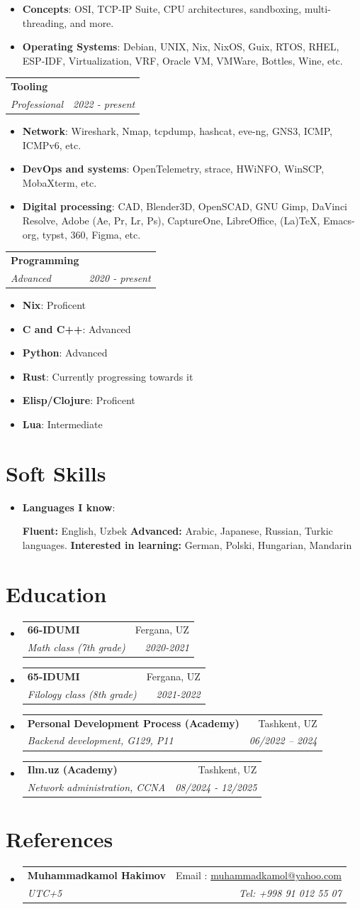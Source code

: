 \documentclass[a4paper,11pt]{article}
\makeatletter
\newcommand{\resumeItem}[2]{
    \item\small{
        \textbf{#1}{: #2 \vspace{-2pt}}
    }
}
\newcommand{\resumeSubheading}[4]{
    \vspace{-1pt}\item
    \begin{tabular*}{0.97\textwidth}{l@{\extracolsep{\fill}}r}
        \textbf{#1}       & #2                 \\
        \textit{\small#3} & \textit{\small #4} \\
    \end{tabular*}\vspace{-5pt}
}
\newcommand{\resumeSubHeadingListStart}{\begin{itemize}[leftmargin=*]}
\newcommand{\resumeSubHeadingListEnd}{\end{itemize}}
\newcommand{\resumeItemListStart}{\begin{itemize}}
\newcommand{\resumeItemListEnd}{\end{itemize}\vspace{-5pt}}
\makeatother
\begin{document}
\resumeItemListStart
\resumeItem{Concepts}{OSI, TCP-IP Suite, CPU architectures, sandboxing, multi-threading, and more. }
\resumeItem{Operating Systems}{Debian, UNIX, Nix, NixOS, Guix, RTOS, RHEL, ESP-IDF, Virtualization, VRF, Oracle VM, VMWare, Bottles, Wine, etc.}
\resumeItemListEnd

\resumeSubheading
{Tooling}{}
{Professional}{2022 - present}

\resumeItemListStart
\resumeItem{Network}{Wireshark, Nmap, tcpdump, hashcat, eve-ng, GNS3, ICMP, ICMPv6, etc. }
\resumeItem{DevOps and systems}{OpenTelemetry, strace, HWiNFO, WinSCP, MobaXterm, etc. }
\resumeItem{Digital processing}{CAD, Blender3D, OpenSCAD, GNU Gimp, DaVinci Resolve, Adobe (Ae, Pr, Lr, Ps), CaptureOne, LibreOffice, (La)TeX, Emacs-org, typst, 360, Figma, etc. }
\resumeItemListEnd


\resumeSubheading
{Programming}{}
{Advanced}{2020 - present}

\resumeItemListStart
\resumeItem{Nix}{Proficent}
\resumeItem{C and C++}{Advanced}
\resumeItem{Python}{Advanced}
\resumeItem{Rust}{Currently progressing towards it}
\resumeItem{Elisp/Clojure}{Proficent}
\resumeItem{Lua}{Intermediate}
\resumeItemListEnd

\section{Soft Skills}
\resumeSubHeadingListStart
\resumeItem{Languages I know}{}
\subitem \textbf{Fluent:} English, Uzbek
\subitem \textbf{Advanced:} Arabic, Japanese, Russian, Turkic languages.
\subitem \textbf{Interested in learning:} German, Polski, Hungarian, Mandarin
\resumeSubHeadingListEnd

\section{Education}
\resumeSubHeadingListStart
\resumeSubheading
{66-IDUMI}{Fergana, UZ}
{Math class (7th grade)}{2020-2021}
\resumeSubheading
{65-IDUMI}{Fergana, UZ}
{Filology class (8th grade)}{2021-2022}
\resumeSubheading
{Personal Development Process (Academy)}{Tashkent, UZ}
{Backend development, G129, P11}{06/2022 – 2024}
\resumeSubheading
{Ilm.uz (Academy)}{Tashkent, UZ}
{Network administration, CCNA}{08/2024 - 12/2025}
\resumeSubHeadingListEnd

\section{References}
\resumeSubHeadingListStart

\resumeSubheading
{Muhammadkamol Hakimov}{Email : \href{muhammadkamol@yahoo.com}{muhammadkamol@yahoo.com}}
{UTC+5}{Tel: +998 91 012 55 07}

\resumeSubHeadingListEnd

\end{document}
